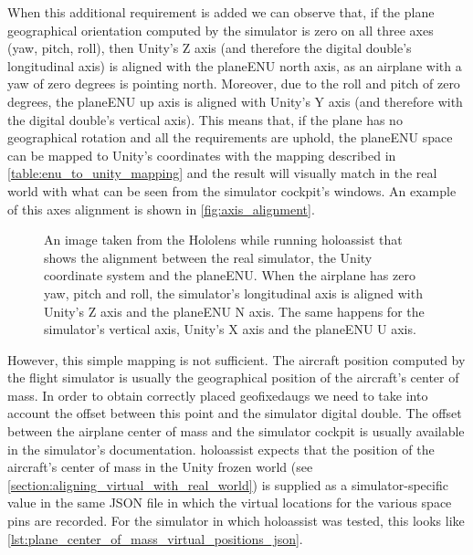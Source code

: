 When this additional requirement is added we can observe that, if the plane geographical orientation computed by the simulator is zero on all three axes (yaw, pitch, roll), then Unity's Z axis (and therefore the digital double's longitudinal axis) is aligned with the \gls{planeENU} north axis, as an airplane with a yaw of zero degrees is pointing north. Moreover, due to the roll and pitch of zero degrees, the \gls{planeENU} up axis is aligned with Unity's Y axis (and therefore with the digital double's vertical axis). This means that, if the plane has no geographical rotation and all the requirements are uphold, the \gls{planeENU} space can be mapped to Unity's coordinates with the mapping described in \autoref{table:enu_to_unity_mapping} and the result will visually match in the real world with what can be seen from the simulator cockpit's windows. An example of this axes alignment is shown in \autoref{fig:axis_alignment}.

\begin{figure}
  \centering
  \hfill
  \caption{An image taken from the Hololens while running \gls{holoassist} that shows the alignment between the real simulator, the Unity coordinate system and the \gls{planeENU}. When the airplane has zero yaw, pitch and roll, the simulator's longitudinal axis is aligned with Unity's Z axis and the \gls{planeENU} N axis. The same happens for the simulator's vertical axis, Unity's X axis and the \gls{planeENU} U axis.}\label{fig:axis_alignment}
\end{figure}


However, this simple mapping is not sufficient. The aircraft position computed by the flight simulator is usually the geographical position of the aircraft's center of mass. In order to obtain correctly placed \glspl{geofixedaug} we need to take into account the offset between this point and the simulator digital double. The offset between the airplane center of mass and the simulator cockpit is usually available in the simulator's documentation. \gls{holoassist} expects that the position of the aircraft's center of mass in the Unity frozen world (see \autoref{section:aligning_virtual_with_real_world}) is supplied as a simulator-specific value in the same JSON file in which the virtual locations for the various space pins are recorded. For the simulator in which \gls{holoassist} was tested, this looks like \autoref{lst:plane_center_of_mass_virtual_positions_json}.

